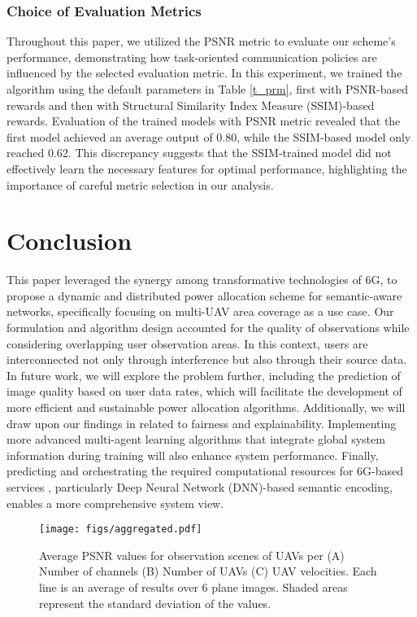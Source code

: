\documentclass[conference]{IEEEtran}
\begin{document}
\subsubsection{Choice of Evaluation Metrics}
Throughout this paper, we utilized the PSNR metric to evaluate our scheme's performance, demonstrating how task-oriented communication policies are influenced by the selected evaluation metric. In this experiment, we trained the algorithm using the default parameters in Table \ref{t_prm}, first with PSNR-based rewards and then with Structural Similarity Index Measure (SSIM)-based rewards. Evaluation of the trained models with PSNR metric revealed that the first model achieved an average output of 0.80, while the SSIM-based model only reached 0.62. This discrepancy suggests that the SSIM-trained model did not effectively learn the necessary features for optimal performance, highlighting the importance of careful metric selection in our analysis.

\section{Conclusion}\label{s_con}
This paper leveraged the synergy among transformative technologies of 6G, to propose a dynamic and distributed power allocation scheme for semantic-aware networks, specifically focusing on multi-UAV area coverage as a use case. Our formulation and algorithm design accounted for the quality of observations while considering overlapping user observation areas. In this context, users are interconnected not only through interference but also through their source data. In future work, we will explore the problem further, including the prediction of image quality based on user data rates, which will facilitate the development of more efficient and sustainable power allocation algorithms. Additionally, we will draw upon our findings in \cite{shokrnezhad2024fairness} related to fairness and explainability. Implementing more advanced multi-agent learning algorithms that integrate global system information during training will also enhance system performance. Finally, predicting and orchestrating the required computational resources for 6G-based services \cite{farhoudi2023qos, 10816182, farhoudi2024discovery}, particularly Deep Neural Network (DNN)-based semantic encoding, enables a more comprehensive system view.

\begin{figure}[!t]
\centerline{\texttt{[image: figs/aggregated.pdf]}}
    \caption{ Average PSNR values for observation scenes of UAVs per (A) Number of channels (B) Number of UAVs (C) UAV velocities. Each line is an average of results over 6 plane images. Shaded areas represent the standard deviation of the values.}
    \label{aggregated}
\end{figure}
\end{document}
